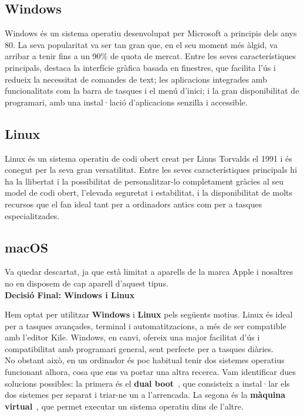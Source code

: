 \subsection{Windows}
Windows és un sistema operatiu desenvolupat per Microsoft a principis dels anys 80. La seva popularitat va ser tan gran que, en el seu moment més àlgid, va arribar a tenir fins a un 90\% de quota de mercat. Entre les seves característiques principals, destaca la interfície gràfica basada en finestres, que facilita l’ús i redueix la necessitat de comandes de text; les aplicacions integrades amb funcionalitats com la barra de tasques i el menú d’inici; i la gran disponibilitat de programari, amb una instal·lació d’aplicacions senzilla i accessible.

\subsection{Linux}
Linux és un sistema operatiu de codi obert creat per Linus Torvalds el 1991 i és conegut per la seva gran versatilitat. Entre les seves característiques principals hi ha la llibertat i la possibilitat de personalitzar-lo completament gràcies al seu model de codi obert, l’elevada seguretat i estabilitat, i la disponibilitat de molts recursos que el fan ideal tant per a ordinadors antics com per a tasques especialitzades.

\subsection{macOS}
\label{subsec:Mac OS}
Va quedar descartat, ja que està limitat a aparells de la marca Apple i nosaltres no en disposem de cap aparell d'aquest tipus.\\

\textbf{Decisió Final: Windows i Linux}

Hem optat per utilitzar \textbf{Windows} i \textbf{Linux} pels següents motius. Linux és ideal per a tasques avançades, terminal i automatitzacions, a més de ser compatible amb l’editor Kile. Windows, en canvi, ofereix una major facilitat d’ús i compatibilitat amb programari general, sent perfecte per a tasques diàries.\\

No obstant això, en un ordinador és poc habitual tenir dos sistemes operatius funcionant alhora, cosa que ens va portar una altra recerca. Vam identificar dues solucions possibles: la primera és el \textbf{dual boot}~\cite{DualBoot}, que consisteix a instal·lar els dos sistemes per separat i triar-ne un a l’arrencada. La segona és la \textbf{màquina virtual}~\cite{MàquinaVirtual}, que permet executar un sistema operatiu dins de l’altre.\\

